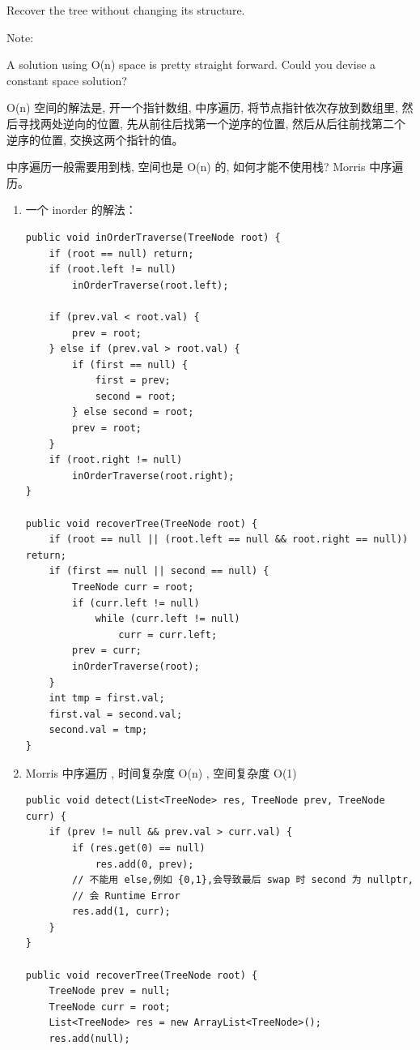 \documentclass[12pt]{book}
\begin{document}
Recover the tree without changing its structure.

Note:

A solution using O(n) space is pretty straight forward. Could you devise a constant space solution?

O(n) 空间的解法是, 开一个指针数组, 中序遍历, 将节点指针依次存放到数组里, 然后寻找两处逆向的位置, 先从前往后找第一个逆序的位置, 然后从后往前找第二个逆序的位置, 交换这两个指针的值。

中序遍历一般需要用到栈, 空间也是 O(n) 的, 如何才能不使用栈? Morris 中序遍历。

\begin{enumerate}
\item 一个 inorder 的解法：
\label{sec-4-2-7-1}

\lstset{language=java,label= ,caption= ,numbers=none}
\begin{lstlisting}
public void inOrderTraverse(TreeNode root) {
    if (root == null) return;
    if (root.left != null)
        inOrderTraverse(root.left);

    if (prev.val < root.val) {
        prev = root;
    } else if (prev.val > root.val) {
        if (first == null) {
            first = prev;
            second = root;
        } else second = root;
        prev = root;
    }
    if (root.right != null)
        inOrderTraverse(root.right);
}

public void recoverTree(TreeNode root) {
    if (root == null || (root.left == null && root.right == null)) return;
    if (first == null || second == null) {
        TreeNode curr = root;
        if (curr.left != null)
            while (curr.left != null) 
                curr = curr.left;
        prev = curr;
        inOrderTraverse(root);
    }
    int tmp = first.val;
    first.val = second.val;
    second.val = tmp;
}
\end{lstlisting}

\item Morris 中序遍历 , 时间复杂度 O(n) , 空间复杂度 O(1)
\label{sec-4-2-7-2}

\lstset{language=java,label= ,caption= ,numbers=none}
\begin{lstlisting}
public void detect(List<TreeNode> res, TreeNode prev, TreeNode curr) {
    if (prev != null && prev.val > curr.val) {
        if (res.get(0) == null)
            res.add(0, prev); 
        // 不能用 else,例如 {0,1},会导致最后 swap 时 second 为 nullptr,
        // 会 Runtime Error
        res.add(1, curr);
    }
}
        
public void recoverTree(TreeNode root) {
    TreeNode prev = null;
    TreeNode curr = root;
    List<TreeNode> res = new ArrayList<TreeNode>();
    res.add(null);


\end{lstlisting}
\end{enumerate}
\end{document}
